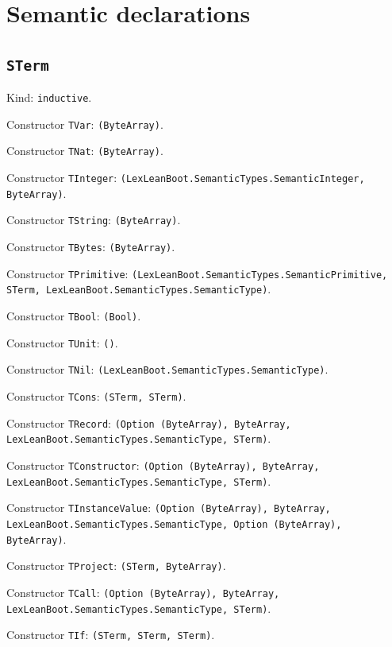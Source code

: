 \documentclass[11pt]{article}
\begin{document}
\section*{Semantic declarations}
\subsection*{\texttt{STerm}}
\noindent Kind: \texttt{inductive}.\par
\noindent Constructor \texttt{TVar}: \texttt{(ByteArray)}.\par
\noindent Constructor \texttt{TNat}: \texttt{(ByteArray)}.\par
\noindent Constructor \texttt{TInteger}: \texttt{(LexLeanBoot.SemanticTypes.SemanticInteger, ByteArray)}.\par
\noindent Constructor \texttt{TString}: \texttt{(ByteArray)}.\par
\noindent Constructor \texttt{TBytes}: \texttt{(ByteArray)}.\par
\noindent Constructor \texttt{TPrimitive}: \texttt{(LexLeanBoot.SemanticTypes.SemanticPrimitive, STerm, LexLeanBoot.SemanticTypes.SemanticType)}.\par
\noindent Constructor \texttt{TBool}: \texttt{(Bool)}.\par
\noindent Constructor \texttt{TUnit}: \texttt{()}.\par
\noindent Constructor \texttt{TNil}: \texttt{(LexLeanBoot.SemanticTypes.SemanticType)}.\par
\noindent Constructor \texttt{TCons}: \texttt{(STerm, STerm)}.\par
\noindent Constructor \texttt{TRecord}: \texttt{(Option (ByteArray), ByteArray, LexLeanBoot.SemanticTypes.SemanticType, STerm)}.\par
\noindent Constructor \texttt{TConstructor}: \texttt{(Option (ByteArray), ByteArray, LexLeanBoot.SemanticTypes.SemanticType, STerm)}.\par
\noindent Constructor \texttt{TInstanceValue}: \texttt{(Option (ByteArray), ByteArray, LexLeanBoot.SemanticTypes.SemanticType, Option (ByteArray), ByteArray)}.\par
\noindent Constructor \texttt{TProject}: \texttt{(STerm, ByteArray)}.\par
\noindent Constructor \texttt{TCall}: \texttt{(Option (ByteArray), ByteArray, LexLeanBoot.SemanticTypes.SemanticType, STerm)}.\par
\noindent Constructor \texttt{TIf}: \texttt{(STerm, STerm, STerm)}.\par
\end{document}
